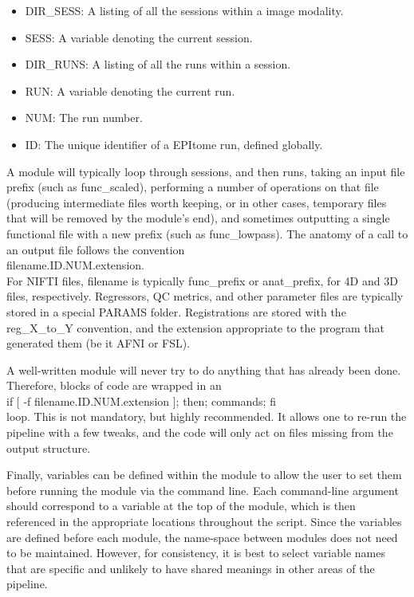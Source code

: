 \documentclass[final,titlepage,letterpaper,oneside,12pt]{article}
\renewcommand{\texttt}[2][BrickRed]{\textcolor{#1}{\ttfamily #2}}%
\begin{document}
\begin{itemize}
    \item{DIR\_SESS: A listing of all the sessions within a image modality.}
    \item{SESS: A variable denoting the current session.}
    \item{DIR\_RUNS: A listing of all the runs within a session.}
    \item{RUN: A variable denoting the current run.}
    \item{NUM: The run number.}
    \item{ID: The unique identifier of a EPItome run, defined globally.}
\end{itemize}

A module will typically loop through sessions, and then runs, taking an input file prefix (such as \texttt{func\_scaled}), performing a number of operations on that file (producing intermediate files worth keeping, or in other cases, temporary files that will be removed by the module's end), and sometimes outputting a single functional file with a new prefix (such as \texttt{func\_lowpass}). The anatomy of a call to an output file follows the convention \\

\texttt{filename.ID.NUM.extension}. \\

For NIFTI files, \texttt{filename} is typically \texttt{func\_prefix} or \texttt{anat\_prefix}, for 4D and 3D files, respectively. Regressors, QC metrics, and other parameter files are typically stored in a special \texttt{PARAMS} folder. Registrations are stored with the \texttt{reg\_X\_to\_Y} convention, and the extension appropriate to the program that generated them (be it AFNI or FSL).

A well-written module will never try to do anything that has already been done. Therefore, blocks of code are wrapped in an \\

\texttt{if [ -f filename.ID.NUM.extension ]; then; commands; fi} \\

\noindent 
loop. This is not mandatory, but highly recommended. It allows one to re-run the pipeline with a few tweaks, and the code will only act on files missing from the output structure. 

Finally, variables can be defined within the module to allow the user to set them before running the module via the command line. Each command-line argument should correspond to a variable at the top of the module, which is then referenced in the appropriate locations throughout the script. Since the variables are defined before each module, the name-space between modules does not need to be maintained. However, for consistency, it is best to select variable names that are specific and unlikely to have shared meanings in other areas of the pipeline. 
\end{document}
